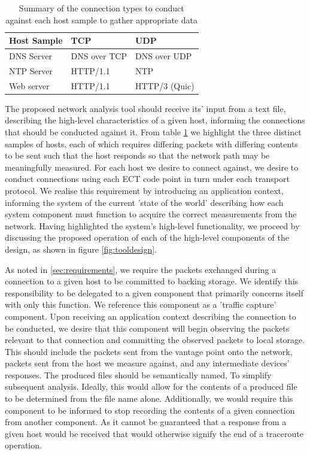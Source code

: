 \documentclass{l4proj}
\begin{document}
\begin{table}[H]
\centering
\begin{tabular}{|l|l|l|}
\hline
\textbf{Host Sample} & \textbf{TCP}          & \textbf{UDP}           \\ \hline
DNS Server  & DNS over TCP & DNS over UDP  \\ \hline
NTP Server  & HTTP/1.1     & NTP           \\ \hline
Web server  & HTTP/1.1     & HTTP/3 (Quic) \\ \hline
\end{tabular}
\caption{Summary of the connection types to conduct against each host sample to gather appropriate data}
\label{table:proto}
\end{table}

The proposed network analysis tool should receive its' input from a text file, describing the high-level characteristics of a given host, informing the connections that should be conducted against it. From table \ref{table:proto} we highlight the three distinct samples of hosts, each of which requires differing packets with differing contents to be sent such that the host responds so that the network path may be meaningfully measured. For each host we desire to connect against, we desire to conduct connections using each ECT code point in turn under each transport protocol. We realise this requirement by introducing an application context, informing the system of the current 'state of the world' describing how each system component must function to acquire the correct measurements from the network. Having highlighted the system's high-level functionality, we proceed by discussing the proposed operation of each of the high-level components of the design, as shown in figure \ref{fig:tooldesign}.

As noted in \ref{sec:requirements}, we require the packets exchanged during a connection to a given host to be committed to backing storage. We identify this responsibility to be delegated to a given component that primarily concerns itself with only this function. We reference this component as a 'traffic capture' component. Upon receiving an application context describing the connection to be conducted, we desire that this component will begin observing the packets relevant to that connection and committing the observed packets to local storage. This should include the packets sent from the vantage point onto the network, packets sent from the host we measure against, and any intermediate devices' responses. The produced files should be semantically named, To simplify subsequent analysis. Ideally, this would allow for the contents of a produced file to be determined from the file name alone. Additionally, we would require this component to be informed to stop recording the contents of a given connection from another component. As it cannot be guaranteed that a response from a given host would be received that would otherwise signify the end of a traceroute operation.
\end{document}
